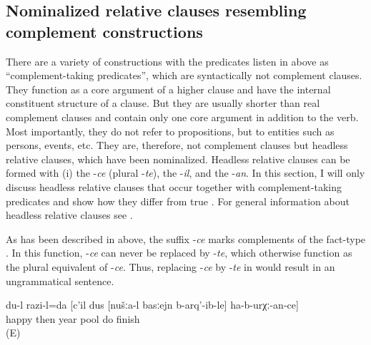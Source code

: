 \subsection{Nominalized relative clauses resembling complement constructions}
\label{ssec:Nominalized relative clauses resembling complement constructions}
There are a variety of constructions with the predicates listen in  above as ``complement-taking predicates'', which are syntactically not complement clauses. They function as a core argument of a higher clause and have the internal constituent structure of a clause. But they are usually shorter than real complement clauses and contain only one core argument in addition to the verb. Most importantly, they do not refer to propositions, but to entities such as persons, events, etc. They are, therefore, not complement clauses but headless relative clauses, which have been nominalized. Headless relative clauses can be formed with (i) the  -\textit{ce} (plural -\textit{te}), the  -\textit{il}, and the  -\textit{an}. In this section, I will only discuss headless relative clauses that occur together with complement-taking predicates and show how they differ from true . For general information about headless relative clauses see .

As has been described in  above, the suffix -\textit{ce} marks complements of the fact-type . In this function, -\textit{ce} can never be replaced by  -\textit{te}, which otherwise function as the plural equivalent of -\textit{ce}. Thus, replacing -\textit{ce} by -\textit{te} in  would result in an ungrammatical sentence.

\begin{exe}
		\ex	\label{‎‎‎I am happy that during the next year we will finish}
	\gll	du-l		razi-l=da		[c'il	dus	[nušːa-l	basːejn	b-arq'-ib-le]		ha-b-urχː-an-ce]\\
			happy	then	year		pool	do	finish \\
	\glt	{} (E)
\end{exe}
	
